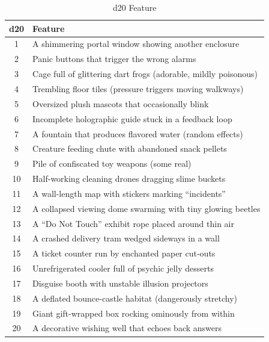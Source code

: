 \begin{table}[h]
\centering
\caption{d20 Feature}
\label{tab:location-feature}
\begin{tabular}{@{}cl@{}}
\toprule
d20 & Feature \\
\midrule
1 & A shimmering portal window showing another enclosure \\
2 & Panic buttons that trigger the wrong alarms \\
3 & Cage full of glittering dart frogs (adorable, mildly poisonous) \\
4 & Trembling floor tiles (pressure triggers moving walkways) \\
5 & Oversized plush mascots that occasionally blink \\
6 & Incomplete holographic guide stuck in a feedback loop \\
7 & A fountain that produces flavored water (random effects) \\
8 & Creature feeding chute with abandoned snack pellets \\
9 & Pile of confiscated toy weapons (some real) \\
10 & Half-working cleaning drones dragging slime buckets \\
11 & A wall-length map with stickers marking ``incidents'' \\
12 & A collapsed viewing dome swarming with tiny glowing beetles \\
13 & A ``Do Not Touch'' exhibit rope placed around thin air \\
14 & A crashed delivery tram wedged sideways in a wall \\
15 & A ticket counter run by enchanted paper cut-outs \\
16 & Unrefrigerated cooler full of psychic jelly desserts \\
17 & Disguise booth with unstable illusion projectors \\
18 & A deflated bounce-castle habitat (dangerously stretchy) \\
19 & Giant gift-wrapped box rocking ominously from within \\
20 & A decorative wishing well that echoes back answers \\
\bottomrule
\end{tabular}
\end{table}

